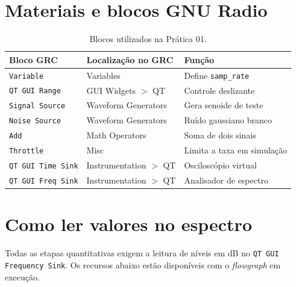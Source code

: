 \documentclass[11pt,a4paper]{article}
\begin{document}
\section{Materiais e blocos GNU Radio}

\begin{table}[H]
  \centering
  \begin{tabular}{l l l}
    \toprule
    \textbf{Bloco GRC} & \textbf{Localização no GRC} & \textbf{Função} \\
    \midrule
    \texttt{Variable}          & Variables               & Define \texttt{samp\_rate} \\
    \texttt{QT GUI Range}      & GUI Widgets $>$ QT      & Controle deslizante \\
    \texttt{Signal Source}     & Waveform Generators     & Gera senoide de teste \\
    \texttt{Noise Source}      & Waveform Generators     & Ruído gaussiano branco \\
    \texttt{Add}               & Math Operators          & Soma de dois sinais \\
    \texttt{Throttle}          & Misc                    & Limita a taxa em simulação \\
    \texttt{QT GUI Time Sink}  & Instrumentation $>$ QT  & Osciloscópio virtual \\
    \texttt{QT GUI Freq Sink}  & Instrumentation $>$ QT  & Analisador de espectro \\
    \bottomrule
  \end{tabular}
  \caption{Blocos utilizados na Prática 01.}
  \label{tab:blocos}
\end{table}

\section{Como ler valores no espectro}

Todas as etapas quantitativas exigem a leitura de níveis em dB no
\texttt{QT GUI Frequency Sink}. Os recursos abaixo estão disponíveis com o
\textit{flowgraph} em execução.
\end{document}
